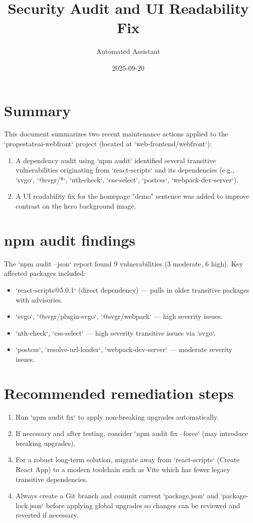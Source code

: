 \documentclass{article}
\title{Security Audit and UI Readability Fix}
\author{Automated Assistant}
\date{2025-09-20}
\begin{document}
\maketitle

\section*{Summary}
This document summarizes two recent maintenance actions applied to the `propestateai-webfront` project (located at `web-frontend/webfront`):
\begin{enumerate}
  \item A dependency audit using `npm audit` identified several transitive vulnerabilities originating from `react-scripts` and its dependencies (e.g., `svgo`, `@svgr/*`, `nth-check`, `css-select`, `postcss`, `webpack-dev-server`).
  \item A UI readability fix for the homepage "demo" sentence was added to improve contrast on the hero background image.
\end{enumerate}

\section*{npm audit findings}
The `npm audit --json` report found 9 vulnerabilities (3 moderate, 6 high). Key affected packages included:
\begin{itemize}
  \item `react-scripts@5.0.1` (direct dependency) --- pulls in older transitive packages with advisories.
  \item `svgo`, `@svgr/plugin-svgo`, `@svgr/webpack` --- high severity issues.
  \item `nth-check`, `css-select` --- high severity transitive issues via `svgo`.
  \item `postcss`, `resolve-url-loader`, `webpack-dev-server` --- moderate severity issues.
\end{itemize}

\section*{Recommended remediation steps}
\begin{enumerate}
  \item Run `npm audit fix` to apply non-breaking upgrades automatically.
  \item If necessary and after testing, consider `npm audit fix --force` (may introduce breaking upgrades).
  \item For a robust long-term solution, migrate away from `react-scripts` (Create React App) to a modern toolchain such as Vite which has fewer legacy transitive dependencies.
  \item Always create a Git branch and commit current `package.json` and `package-lock.json` before applying global upgrades so changes can be reviewed and reverted if necessary.
\end{enumerate}
\end{document}
